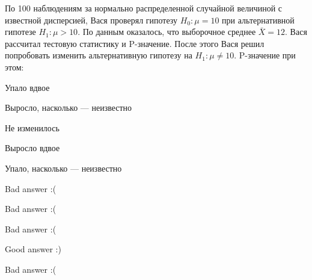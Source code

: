 
\begin{question}
По 100 наблюдениям за нормально распределенной случайной величиной с
известной дисперсией, Вася проверял гипотезу \(H_0: \mu = 10\) при
альтернативной гипотезе \(H_1: \mu > 10\). По данным оказалось, что
выборочное среднее \(\bar{X} = 12\). Вася рассчитал тестовую статистику
и P-значение. После этого Вася решил попробовать изменить альтернативную
гипотезу на \(H_1: \mu \neq 10\). P-значение при этом:
\begin{answerlist}
  \item Упало вдвое
  \item Выросло, насколько --- неизвестно
  \item Не изменилось
  \item Выросло вдвое
  \item Упало, насколько --- неизвестно
\end{answerlist}
\end{question}

\begin{solution}
\begin{answerlist}
  \item Bad answer :(
  \item Bad answer :(
  \item Bad answer :(
  \item Good answer :)
  \item Bad answer :(
\end{answerlist}
\end{solution}

